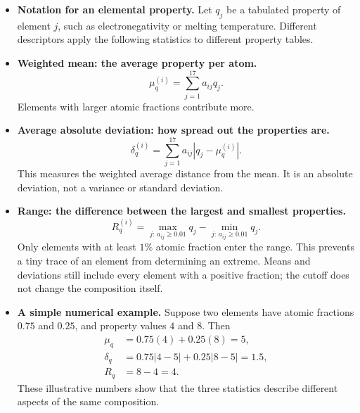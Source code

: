 \documentclass[11pt]{article}
\newenvironment{notes}
  {\begin{itemize}\setlength{\itemsep}{0.45em}\setlength{\parsep}{0pt}}
  {\end{itemize}}
\begin{document}
\begin{notes}
    \item \textbf{Notation for an elemental property.}
    Let \(q_j\) be a tabulated property of element \(j\),
    such as electronegativity or melting temperature.
    Different descriptors apply the following statistics
    to different property tables.

    \item \textbf{Weighted mean: the average property per atom.}
    \begin{equation}
        \mu_q^{(i)}
        =
        \sum_{j=1}^{17}a_{ij}q_j.
        \label{eq:magpie-mean}
    \end{equation}
    Elements with larger atomic fractions contribute more.

    \item \textbf{Average absolute deviation: how spread out the properties are.}
    \begin{equation}
        \delta_q^{(i)}
        =
        \sum_{j=1}^{17}a_{ij}
        \left|q_j-\mu_q^{(i)}\right|.
        \label{eq:magpie-deviation}
    \end{equation}
    This measures the weighted average distance from the
    mean. It is an absolute deviation, not a variance or
    standard deviation.

    \item \textbf{Range: the difference between the largest and smallest properties.}
    \begin{equation}
        R_q^{(i)}
        =
        \max_{j:\,a_{ij}\geq0.01}q_j
        -
        \min_{j:\,a_{ij}\geq0.01}q_j.
        \label{eq:magpie-range}
    \end{equation}
    Only elements with at least \(1\%\) atomic fraction
    enter the range. This prevents a tiny trace of an
    element from determining an extreme.
    Means and deviations still include every element with
    a positive fraction; the cutoff does not change the
    composition itself.

    \item \textbf{A simple numerical example.}
    Suppose two elements have atomic fractions \(0.75\)
    and \(0.25\), and property values \(4\) and \(8\).
    Then
    \[
    \begin{aligned}
        \mu_q&=0.75(4)+0.25(8)=5,\\
        \delta_q&=0.75|4-5|+0.25|8-5|=1.5,\\
        R_q&=8-4=4.
    \end{aligned}
    \]
    These illustrative numbers show that the three
    statistics describe different aspects of the same
    composition.
\end{notes}
\end{document}
